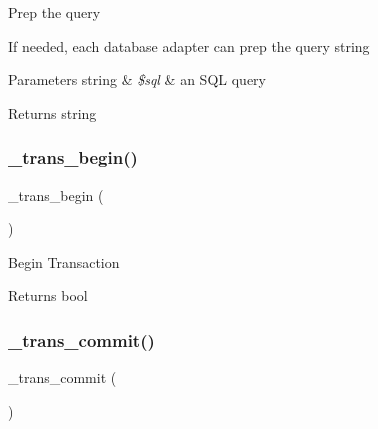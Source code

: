 Prep the query

If needed, each database adapter can prep the query string


\begin{DoxyParams}[1]{Parameters}
string & {\em \$sql} & an S\+QL query \\
\hline
\end{DoxyParams}
\begin{DoxyReturn}{Returns}
string 
\end{DoxyReturn}
\mbox{\label{class_c_i___d_b__mysqli__driver_ac81ac882c1d54347d810199a15856aac}} 
\subsubsection{\texorpdfstring{\+\_\+trans\+\_\+begin()}{\_trans\_begin()}}
{\footnotesize\ttfamily \+\_\+trans\+\_\+begin (\begin{DoxyParamCaption}{ }\end{DoxyParamCaption})\hspace{0.3cm}{\ttfamily [protected]}}

Begin Transaction

\begin{DoxyReturn}{Returns}
bool 
\end{DoxyReturn}
\mbox{\label{class_c_i___d_b__mysqli__driver_a6fe7f373e0b11cfae23a5f41c0b35dda}} 
\subsubsection{\texorpdfstring{\+\_\+trans\+\_\+commit()}{\_trans\_commit()}}
{\footnotesize\ttfamily \+\_\+trans\+\_\+commit (\begin{DoxyParamCaption}{ }\end{DoxyParamCaption})\hspace{0.3cm}{\ttfamily [protected]}}


